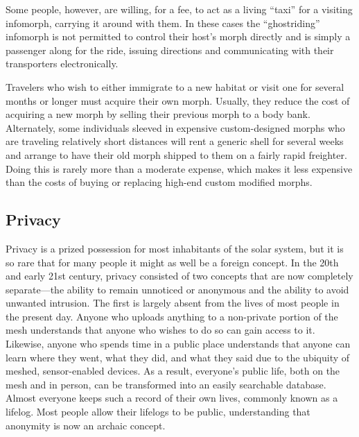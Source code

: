 Some people, however, are willing, for a fee, to act as a living
“taxi” for a visiting infomorph, carrying it around with them. In
these cases the “ghostriding” infomorph is not permitted to control
their host's morph directly and is simply a passenger along for the
ride, issuing directions and communicating with their transporters
electronically.

Travelers who wish to either immigrate to a new habitat or visit one
for several months or longer must acquire their own morph. Usually,
they reduce the cost of acquiring a new morph by selling their
previous morph to a body bank. Alternately, some individuals sleeved
in expensive custom-designed morphs who are traveling relatively short
distances will rent a generic shell for several weeks and arrange to
have their old morph shipped to them on a fairly rapid
freighter. Doing this is rarely more than a moderate expense, which
makes it less expensive than the costs of buying or replacing high-end
custom modified morphs.

\subsection{Privacy}
\label{sec:privacy}

Privacy is a prized possession for most inhabitants of the solar
system, but it is so rare that for many people it might as well be a
foreign concept. In the 20th and early 21st century, privacy consisted
of two concepts that are now completely separate—the ability to remain
unnoticed or anonymous and the ability to avoid unwanted
intrusion. The first is largely absent from the lives of most people
in the present day. Anyone who uploads anything to a non-private
portion of the mesh understands that anyone who wishes to do so can
gain access to it. Likewise, anyone who spends time in a public place
understands that anyone can learn where they went, what they did, and
what they said due to the ubiquity of meshed, sensor-enabled
devices. As a result, everyone's public life, both on the mesh and in
person, can be transformed into an easily searchable database.  Almost
everyone keeps such a record of their own lives, commonly known as a
lifelog. Most people allow their lifelogs to be public, understanding
that anonymity is now an archaic concept.

